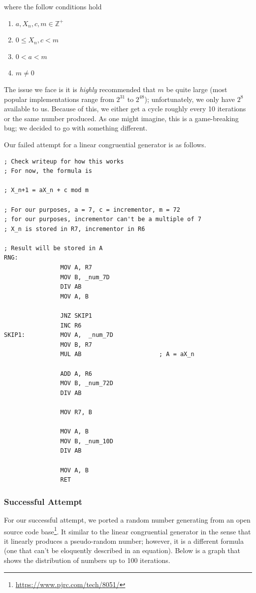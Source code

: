\documentclass[12pt]{article}
\begin{document}
\noindent where the follow conditions hold

\begin{enumerate}
    \item $a, X_n, c, m \in \mathbb{Z}^+$
    \item $0 \leq X_n, c < m$
    \item $0 < a < m$
    \item $m \neq 0$
\end{enumerate}

The issue we face is it is \textit{highly} recommended that $m$ be quite large (most popular implementations range from $2^{31}$ to $2^{48}$); unfortunately, we only have $2^8$ available to us. Because of this, we either get a cycle roughly every \num{10} iterations or the same number produced. As one might imagine, this is a game-breaking bug; we decided to go with something different.

Our failed attempt for a linear congruential generator is as follows.

\begin{verbatim}
; Check writeup for how this works
; For now, the formula is

; X_n+1 = aX_n + c mod m

; For our purposes, a = 7, c = incrementor, m = 72
; for our purposes, incrementor can't be a multiple of 7
; X_n is stored in R7, incrementor in R6

; Result will be stored in A
RNG:
                MOV A, R7
                MOV B, _num_7D
                DIV AB
                MOV A, B

                JNZ SKIP1
                INC R6
SKIP1:          MOV A,  _num_7D
                MOV B, R7
                MUL AB                      ; A = aX_n

                ADD A, R6
                MOV B, _num_72D
                DIV AB

                MOV R7, B

                MOV A, B
                MOV B, _num_10D
                DIV AB

                MOV A, B
                RET
\end{verbatim}

\subsubsection{Successful Attempt}
For our successful attempt, we ported a random number generating from an open source code base\footnote{\url{https://www.pjrc.com/tech/8051/}}. It similar to the linear congruential generator in the sense that it linearly produces a pseudo-random number; however, it is a different formula (one that can't be eloquently described in an equation). Below is a graph that shows the distribution of numbers up to \num{100} iterations.
\end{document}
